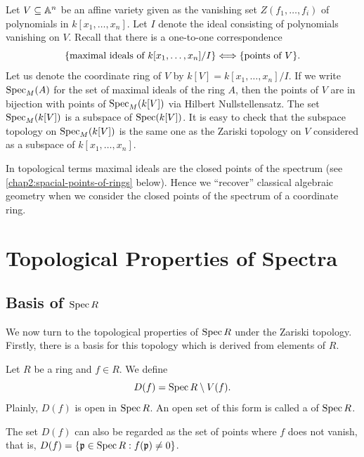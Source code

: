 \begin{example}
	Let $V \subseteq \mathbb A^n$ be an affine variety given as the vanishing set $Z(f_1, \dotsc, f_i)$ of polynomials in $k[x_1, \dotsc, x_n]$. Let $I$ denote the ideal consisting of polynomials vanishing on $V$. Recall that there is a one-to-one correspondence
	\begin{equation*}
		\Set*{\text{maximal ideals of $k[x_1, \dotsc, x_n]/I$}} \Longleftrightarrow \Set*{\text{points of $V$}}.
	\end{equation*}
	Let us denote the coordinate ring of $V$ by $k[V] =k[x_1, \dotsc, x_n]/I$. If we write $\operatorname{Spec}_{M}(A)$ for the set of maximal ideals of the ring $A$, then the points of $V$ are in bijection with points of $\operatorname{Spec}_{M}(k[V])$ via Hilbert Nullstellensatz. The set $\operatorname{Spec}_{M}(k[V])$ is a subspace of $\operatorname{Spec}(k[V])$. It is easy to check that the subspace topology on $\operatorname{Spec}_{M}(k[V])$ is the same one as the Zariski topology on $V$ considered as a subspace of $k[x_1, \dotsc, x_n]$.
\end{example}

In topological terms maximal ideals are the closed points of the spectrum (see \cref{chap2:spacial-points-of-rings} below). Hence we ``recover'' classical algebraic geometry when we consider the closed points of the spectrum of a coordinate ring.

\section{Topological Properties of Spectra}

\subsection*{Basis of $\operatorname{Spec} R$}
We now turn to the topological properties of $\operatorname{Spec} R$ under the Zariski topology. Firstly, there is a basis for this topology which is derived from elements of $R$.

\begin{definition}
	Let $R$ be a ring and $f \in R$. We define
	\begin{equation*}
		D(f) = \operatorname{Spec} R \setminus V(f).
	\end{equation*} 
	Plainly, $D(f)$ is open in $\operatorname{Spec} R$. An open set of this form is called a  of $\operatorname{Spec} R$.
\end{definition}

The set $D(f)$ can also be regarded as the set of points where $f$ does not vanish, that is, $D(f) = \lbrace\mathfrak{p} \in \operatorname{Spec} R : f(\mathfrak{p}) \neq 0\rbrace$.

